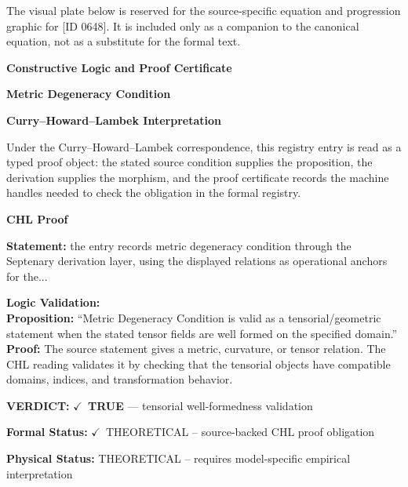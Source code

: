 \begingroup\footnotesize\sloppy
The visual plate below is reserved for the source-specific equation and progression graphic for [ID 0648]. It is included only as a companion to the canonical equation, not as a substitute for the formal text.
\par\endgroup
\ifTZPDarkEdition
{}
\fi

\clearpage
\begingroup\tzpsupportsetup
\noindent\textbf{\fontsize{10.8pt}{12.8pt}\selectfont [ID 0648] Constructive Logic and Proof Certificate}\par
\noindent\textbf{\fontsize{10pt}{12pt}\selectfont Metric Degeneracy Condition}\par
\vspace{0.45em}
\begingroup
\footnotesize
\setlength{\parskip}{0.22em}
\setlength{\parindent}{0pt}
\noindent\textbf{Curry--Howard--Lambek Interpretation}\par
Under the Curry--Howard--Lambek correspondence, this registry entry is read as a typed proof
object: the stated source condition supplies the proposition, the derivation supplies the
morphism, and the proof certificate records the machine handles needed to check the obligation
in the formal registry.

\vspace{0.45em}
\noindent\textbf{CHL Proof}\par
\textbf{Statement:} the entry records metric degeneracy condition through the Septenary derivation layer,
using the displayed relations as operational anchors for the...

\textbf{Logic Validation:}\\
\textbf{Proposition:} ``Metric Degeneracy Condition is valid as a tensorial/geometric statement when the stated
tensor fields are well formed on the specified domain.''\\
\textbf{Proof:} The source statement gives a metric, curvature, or tensor relation. The CHL reading
validates it by checking that the tensorial objects have compatible domains, indices,
and transformation behavior.

\textbf{VERDICT:} \ensuremath{\checkmark}\ \textbf{TRUE} --- tensorial well-formedness validation

\textbf{Formal Status:} \ensuremath{\checkmark}\ THEORETICAL -- source-backed CHL proof obligation

\textbf{Physical Status:} THEORETICAL -- requires model-specific empirical interpretation
\par\vspace{0.45em}
\par
\ifTZPDarkEdition
{}
\fi
\endgroup
\endgroup
